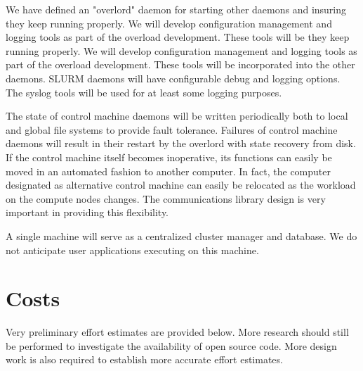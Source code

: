 We have defined an "overlord" daemon for starting other daemons and insuring
they keep running properly. We will develop configuration management and
logging tools as part of the overload development. These tools will be
they keep running properly. We will develop configuration management and
logging tools as part of the overload development. These tools will be
incorporated into the other daemons. SLURM daemons will have configurable debug
and logging options. The syslog tools will be used for at least some logging
purposes.

The state of control machine daemons will be written periodically both to local
and global file systems to provide fault tolerance. Failures of control machine
daemons will result in their restart by the overlord with state recovery from
disk. If the control machine itself becomes inoperative, its functions can
easily be moved in an automated fashion to another computer. In fact, the
computer designated as alternative control machine can easily be relocated as
the workload on the compute nodes changes. The communications library design is
very important in providing this flexibility.

A single machine will serve as a centralized cluster manager and database. We
do not anticipate user applications executing on this machine. 

\section{Costs}

Very preliminary effort estimates are provided below. More research should
still be performed to investigate the availability of open source code. More
design work is also required to establish more accurate effort estimates.

